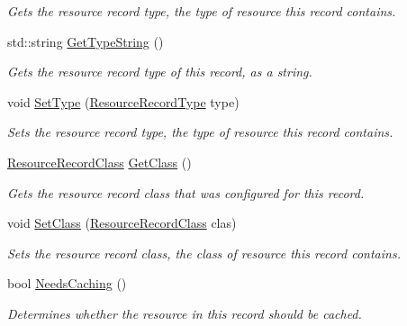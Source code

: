 \begin{DoxyCompactItemize}
\begin{DoxyCompactList}\small\item\em Gets the resource record type, the type of resource this record contains. \end{DoxyCompactList}\item 
std\-::string \hyperlink{class_senergy_1_1_dns_1_1_resource_record_base_a2410ada2a69ff9d2f5b6599c5cda8dc1}{Get\-Type\-String} ()
\begin{DoxyCompactList}\small\item\em Gets the resource record type of this record, as a string. \end{DoxyCompactList}\item 
void \hyperlink{class_senergy_1_1_dns_1_1_resource_record_base_affcaab56c3632a361a654ed5bc79b3c4}{Set\-Type} (\hyperlink{namespace_senergy_1_1_dns_a590bfd748c955364770f5ce358d9dfe0}{Resource\-Record\-Type} type)
\begin{DoxyCompactList}\small\item\em Sets the resource record type, the type of resource this record contains. \end{DoxyCompactList}\item 
\hyperlink{namespace_senergy_1_1_dns_a953f153bc411213d621d00c1e1b3eb9d}{Resource\-Record\-Class} \hyperlink{class_senergy_1_1_dns_1_1_resource_record_base_a4abfe4f1eeb552494be535c271abe18f}{Get\-Class} ()
\begin{DoxyCompactList}\small\item\em Gets the resource record class that was configured for this record. \end{DoxyCompactList}\item 
void \hyperlink{class_senergy_1_1_dns_1_1_resource_record_base_a87d4a0202837700dbc6662d9aff8f385}{Set\-Class} (\hyperlink{namespace_senergy_1_1_dns_a953f153bc411213d621d00c1e1b3eb9d}{Resource\-Record\-Class} clas)
\begin{DoxyCompactList}\small\item\em Sets the resource record class, the class of resource this record contains. \end{DoxyCompactList}\item 
bool \hyperlink{class_senergy_1_1_dns_1_1_resource_record_base_a7b6733ccb332b22335e33e09ad7bddd0}{Needs\-Caching} ()
\begin{DoxyCompactList}\small\item\em Determines whether the resource in this record should be cached. \end{DoxyCompactList}\item 

\end{DoxyCompactItemize}
